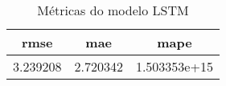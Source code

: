 \begin{table}
\centering
\caption{Métricas do modelo LSTM}
\label{tab:lstm_metrics}
\begin{tabular}{ccc}
\toprule
    rmse &      mae &         mape \\
\midrule
3.239208 & 2.720342 & 1.503353e+15 \\
\bottomrule
\end{tabular}
\end{table}
